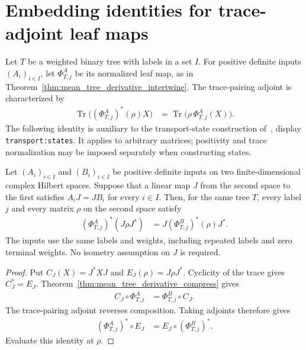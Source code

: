 \section{Embedding identities for trace-adjoint leaf maps}
\label{sec:leaf_state_intertwine}

Let $T$ be a weighted binary tree with labels in a set $I$.
For positive definite inputs $(A_i)_{i\in I}$, let $\Phi_{T,j}^A$
be its normalized leaf map, as in
Theorem~\ref{thm:mean_tree_derivative_intertwine}.
The trace-pairing adjoint is characterized by
\begin{align}
  \operatorname{Tr}\bigl((\Phi_{T,j}^A)^*(\rho)X\bigr)
    &=\operatorname{Tr}\bigl(\rho\,\Phi_{T,j}^A(X)\bigr).
\end{align}
The following identity is auxiliary to the transport-state construction
of~\cite{OpenAI2026AreaLaw}, display \texttt{transport:states}.
It applies to arbitrary matrices; positivity and trace normalization
may be imposed separately when constructing states.

\begin{theorem}
  \label{thm:trace_adjoint_leaf_map_intertwine}
  \leanok
  Let $(A_i)_{i\in I}$ and $(B_i)_{i\in I}$ be positive definite inputs
  on two finite-dimensional complex Hilbert spaces.
  Suppose that a linear map $J$ from the second space to the first
  satisfies $A_iJ=JB_i$ for every $i\in I$.
  Then, for the same tree $T$, every label $j$ and every matrix $\rho$
  on the second space satisfy
  \begin{align}
    (\Phi_{T,j}^A)^*(J\rho J^*)
      &=J(\Phi_{T,j}^B)^*(\rho)J^*.
  \end{align}
  The inputs use the same labels and weights, including repeated labels
  and zero terminal weights. No isometry assumption on $J$ is required.
\end{theorem}

\begin{proof}
  \leanok
  Put $C_J(X)=J^*XJ$ and $E_J(\rho)=J\rho J^*$.
  Cyclicity of the trace gives $C_J^*=E_J$.
  Theorem~\ref{thm:mean_tree_derivative_compress} gives
  \begin{align}
    C_J\circ\Phi_{T,j}^A&=\Phi_{T,j}^B\circ C_J.
  \end{align}
  The trace-pairing adjoint reverses composition. Taking adjoints
  therefore gives
  \begin{align}
    (\Phi_{T,j}^A)^*\circ E_J
      &=E_J\circ(\Phi_{T,j}^B)^*.
  \end{align}
  Evaluate this identity at $\rho$.
\end{proof}
